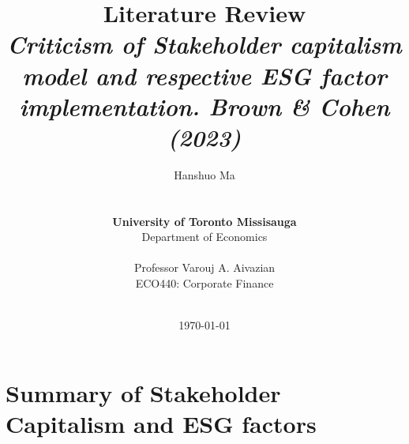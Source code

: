 \documentclass[a4paper, 12pt]{article}
\begin{document}
\title{{\Huge \textbf{Literature Review}{\large\linebreak\\}}{\Large \textit{Criticism of Stakeholder capitalism model and respective ESG factor implementation. Brown \& Cohen (2023)\cite{BrownCohen}}\linebreak\linebreak}}

\author{Hanshuo Ma
\\ \\ \\
\textbf{University of Toronto Missisauga} \\
Department of Economics \\ \\
Professor Varouj A. Aivazian \\
ECO440: Corporate Finance \\ \\}
\date{\today}

\maketitle

\newpage
\tableofcontents\label{c}
\newpage

\section{Summary of Stakeholder Capitalism and ESG factors} \label{Summary} 
\vspace{-10pt}
\end{document}
